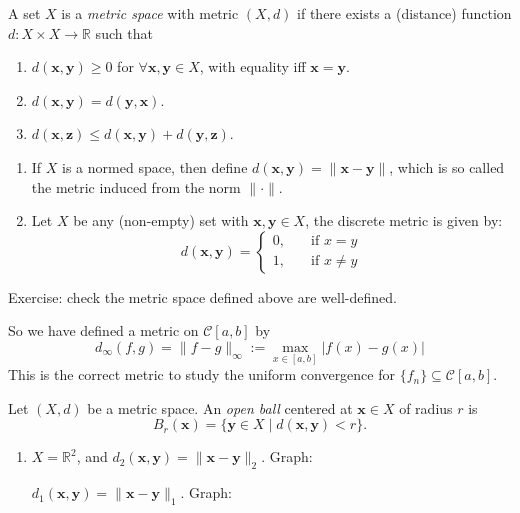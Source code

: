 \begin{definition}
A set $X$ is a \emph{metric space} with metric $(X,d)$ if there exists a (distance) function $d:X\times X\to\mathbb{R}$ such that 
\begin{enumerate}
\item
$d(\bm x,\bm y)\ge0$ for $\forall \bm x,\bm y\in X$, with equality iff $\bm x=\bm y$.
\item
$d(\bm x,\bm y)=d(\bm y,\bm x)$.
\item
$d(\bm x,\bm z)\le d(\bm x,\bm y)+d(\bm y,\bm z)$.
\end{enumerate}
\end{definition}
\begin{example}
\begin{enumerate}
\item
If $X$ is a normed space, then define $d(\bm x,\bm y)=\|\bm x-\bm y\|$, which is so called the metric induced from the norm $\|\cdot\|$.
\item
Let $X$ be any (non-empty) set with $\bm x,\bm y\in X$, the discrete metric is given by:
\[
d(\bm x,\bm y)=\left\{
\begin{aligned}
0,&\quad\mbox{if }x=y\\
1,&\quad\mbox{if }x\ne y
\end{aligned}
\right.
\]
\end{enumerate}
Exercise: check the metric space defined above are well-defined.
\end{example}
So we have defined a metric on $\mathcal{C}[a,b]$ by
\[
d_\infty(f,g)=\|f-g\|_\infty:=\max_{x\in[a,b]}|f(x)-g(x)|
\]
This is the correct metric to study the uniform convergence for $\{f_n\}\subseteq\mathcal{C}[a,b]$.
\begin{definition}
Let $(X,d)$ be a metric space. An \emph{open ball} centered at $\bm x\in X$ of radius $r$ is 
\[
B_r(\bm x)=\{\bm y\in X\mid d(\bm x,\bm y)<r\}.
\]
\end{definition}
\begin{example}
\begin{enumerate}
\item
$X=\mathbb{R}^2$, and $d_2(\bm x,\bm y)=\|\bm x-\bm y\|_2$. Graph:

$d_1(\bm x,\bm y)=\|\bm x-\bm y\|_1$. Graph:
\end{enumerate}
\end{example}













